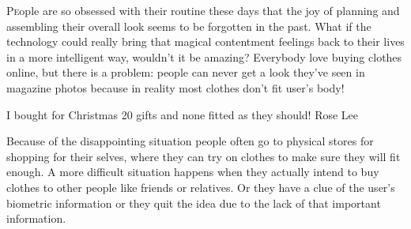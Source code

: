 \documentclass[twoside,twocolumn]{article}
\begin{document}

\lettrine[nindent=0em,lines=3]{P}eople are so obsessed with their routine these
days that the joy of planning and assembling their overall look seems to be
forgotten in the past. What if the technology could really bring that magical
contentment feelings back to their lives in a more intelligent way, wouldn't it
be amazing? Everybody love buying clothes online, but there is a problem: people
can never get a look they've seen in magazine photos because in reality most
clothes don't fit user's body!

I bought for Christmas 20 gifts and none fitted as they should!
Rose Lee

Because of the disappointing situation people often go to physical stores for
shopping for their selves, where they can try on clothes to make sure they will
fit enough. A more difficult situation happens when they actually intend to buy
clothes to other people like friends or relatives. Or they have a clue of the
user's biometric information or they quit the idea due to the lack of that
important information.
\end{document}

